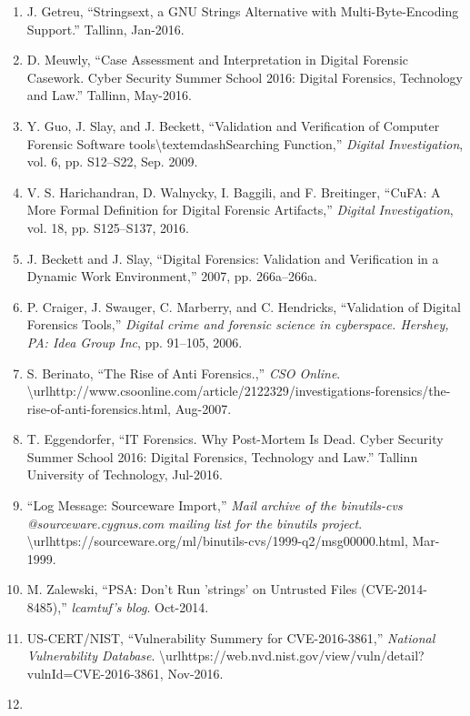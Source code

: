 \begin{enumerate}
\def\labelenumi{\arabic{enumi}.}
\item
  J. Getreu, ``Stringsext, a GNU Strings Alternative with
  Multi-Byte-Encoding Support.'' Tallinn, Jan-2016.
\item
  D. Meuwly, ``Case Assessment and Interpretation in Digital Forensic
  Casework. Cyber Security Summer School 2016: Digital Forensics,
  Technology and Law.'' Tallinn, May-2016.
\item
  Y. Guo, J. Slay, and J. Beckett, ``Validation and Verification of
  Computer Forensic Software tools\textbackslash{}textemdashSearching
  Function,'' \emph{Digital Investigation}, vol. 6, pp. S12--S22, Sep.
  2009.
\item
  V. S. Harichandran, D. Walnycky, I. Baggili, and F. Breitinger,
  ``CuFA: A More Formal Definition for Digital Forensic Artifacts,''
  \emph{Digital Investigation}, vol. 18, pp. S125--S137, 2016.
\item
  J. Beckett and J. Slay, ``Digital Forensics: Validation and
  Verification in a Dynamic Work Environment,'' 2007, pp. 266a--266a.
\item
  P. Craiger, J. Swauger, C. Marberry, and C. Hendricks, ``Validation of
  Digital Forensics Tools,'' \emph{Digital crime and forensic science in
  cyberspace. Hershey, PA: Idea Group Inc}, pp. 91--105, 2006.
\item
  S. Berinato, ``The Rise of Anti Forensics.,'' \emph{CSO Online}.
  \textbackslash{}urlhttp://www.csoonline.com/article/2122329/investigations-forensics/the-rise-of-anti-forensics.html,
  Aug-2007.
\item
  T. Eggendorfer, ``IT Forensics. Why Post-Mortem Is Dead. Cyber
  Security Summer School 2016: Digital Forensics, Technology and Law.''
  Tallinn University of Technology, Jul-2016.
\item
  ``Log Message: Sourceware Import,'' \emph{Mail archive of the
  binutils-cvs @sourceware.cygnus.com mailing list for the binutils
  project}.
  \textbackslash{}urlhttps://sourceware.org/ml/binutils-cvs/1999-q2/msg00000.html,
  Mar-1999.
\item
  M. Zalewski, ``PSA: Don't Run 'strings' on Untrusted Files
  (CVE-2014-8485),'' \emph{lcamtuf's blog}. Oct-2014.
\item
  US-CERT/NIST, ``Vulnerability Summery for CVE-2016-3861,''
  \emph{National Vulnerability Database}.
  \textbackslash{}urlhttps://web.nvd.nist.gov/view/vuln/detail?vulnId=CVE-2016-3861,
  Nov-2016.
\item

\end{enumerate}
